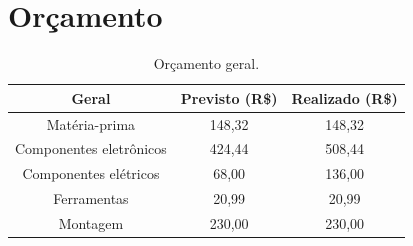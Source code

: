 

\chapter{Orçamento}

\begin{table}[htpb]
\begin{center}
\caption{Orçamento geral.}
\begin{tabular}{|c|c|c|}
\hline
\textbf{Geral}          & \textbf{Previsto (R\$)} & \textbf{Realizado (R\$)} \\ \hline
Matéria-prima           & 148,32                   & 148,32                     \\ \hline
Componentes eletrônicos & 424,44                  & 508,44                    \\ \hline
Componentes elétricos   & 68,00                    & 136,00                   \\ \hline
Ferramentas             & 20,99                    & 20,99                    \\ \hline
Montagem                & 230,00                    & 230,00                     \\ \hline
\end{tabular}
\end{center}
\end{table}

